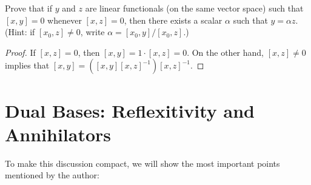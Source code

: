 \documentclass[12pt]{article}
\newenvironment{problem}[2][Problem]{\begin{trivlist} \item[\hskip \labelsep {\bfseries #1}\hskip \labelsep {\bfseries #2.}]}{\end{trivlist}}
\begin{document}
\begin{problem}{6}
  Prove that if $y$ and $z$ are linear functionals (on the same vector space) such that $[x,y]=0$ whenever $[x,z]=0$, then there exists a scalar $\alpha$ such that $y=\alpha z$. (Hint: if $[x_{0}, z] \neq 0$, write $\alpha = [x_{0}, y]/[x_{0},z]$.)
\begin{proof}
  If $[x,z]=0$, then $[x,y]=1\cdot [x,z]=0$. On the other hand, $[x,z]\neq 0$ implies that $[x,y] = \left( [x,y][x,z]^{-1} \right)[x,z]^{-1}$. 
\end{proof}
\end{problem}
\section{Dual Bases: Reflexitivity and Annihilators}
To make this discussion compact, we will show the most important points mentioned by the author:\\
\end{document}
